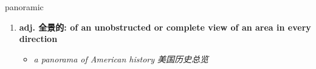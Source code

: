 
\begin{frame}
{\huge panoramic}
\begin{center}
\begin{enumerate}\Large
  \item \textbf{adj. 全景的: of an unobstructed or complete view of an area in every direction}
  \begin{itemize}
    \item \em{\Large{a panorama of American history 美国历史总览}}
  \end{itemize}
\end{enumerate}
\end{center}
\end{frame}
